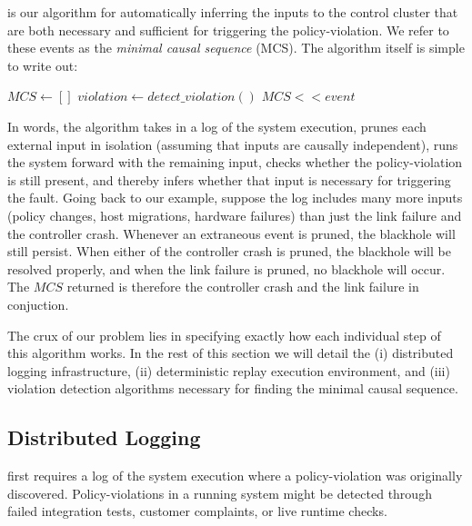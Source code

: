 \Simulator{} is our algorithm for automatically inferring the inputs to the
control cluster that are both necessary and sufficient for triggering the policy-violation. We
refer to these events as the {\em minimal causal sequence} (MCS). The algorithm itself is
simple to write out:

\begin{algorithmic}
\State $MCS \gets []$
    \State $violation \gets detect\_violation()$
        \State $MCS << event$
    \EndIf
\EndFor
\end{algorithmic}

\noindent In words, the algorithm takes in a log of the system execution,
prunes each external input in isolation (assuming that inputs are causally
independent), runs the system forward with the remaining input, checks whether the
policy-violation is still present, and thereby infers whether that input is
necessary for triggering the fault. Going back to our example, suppose the
log includes many more inputs (policy changes, host migrations, hardware
failures) than just the link failure and the controller crash. Whenever an
extraneous event is pruned, the blackhole will still persist. When either of
the controller crash is pruned, the blackhole will be resolved properly, and
when the link failure is pruned, no blackhole will occur. The $MCS$ returned
is therefore the controller crash and the link failure in conjuction.

The crux of our problem lies in specifying exactly how each
individual step of this algorithm works. In the rest of this section we will
detail the (i) distributed logging infrastructure, (ii) deterministic
replay execution environment, and (iii) violation detection algorithms
necessary for finding the minimal causal sequence.

\subsection{Distributed Logging}

\Simulator{} first requires a log of the system execution where a
policy-violation was originally discovered. Policy-violations
in a running system might be detected through failed integration tests,
customer complaints, or live runtime checks.

